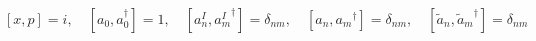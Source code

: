 \begin{equation}  \label{eq:IIBcr}
\left[ x, p \right] = i, \quad
\left[ a_0, a_0^\dagger \right] = 1, \quad
\left[ a^I_n, {a^I_m}^\dagger \right] = \delta_{nm}, \quad
\left[ a_n, {a_m}^\dagger \right] = \delta_{nm}, \quad
\left[ \tilde{a}_n, {\tilde{a}_m}^\dagger \right] = \delta_{nm}
\end{equation}

